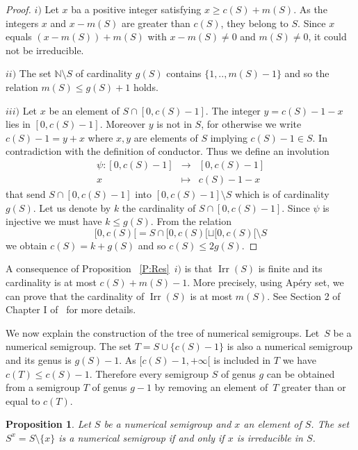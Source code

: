 \documentclass[reqno,11pt]{amsart}
\theoremstyle{plain}
\newtheorem{prop}{Proposition}[section]
\theoremstyle{definition}
\renewcommand{\leq}{\leqslant}
\renewcommand{\geq}{\geqslant}
\newcommand{\NN}{\mathbb{N}}
\DeclareMathOperator{\Irr}{Irr}
\begin{document}
\begin{proof}
$i)$ Let $x$ ba a positive integer satisfying $x \geq c(S)+m(S)$. 
As the integers $x$ and $x-m(S)$ are greater than $c(S)$, they belong to $S$.
Since $x$ equals $(x-m(S))+m(S)$ with $x-m(S)\not=0$ and $m(S)\not=0$, it could not be irreducible.

$ii)$ The set $\NN\setminus{S}$ of cardinality $g(S)$ contains $\{1,..,m(S)-1\}$ and so the relation $m(S)\leq g(S)+1$ holds.

$iii)$ Let $x$ be an element of $S\cap[0,c(S)-1]$. 
The integer $y=c(S)-1-x$ lies in $[0,c(S)-1]$. 
Moreover $y$ is not in $S$, for otherwise  we write $c(S)-1=y+x$ where $x,y$ are elements of $S$ implying $c(S)-1\in S$. 
In contradiction with the definition of conductor. 
Thus we define an involution 
\[
\begin{array}{rcl}
\psi:[0,c(S)-1]&\to&[0,c(S)-1]\\
x&\mapsto&c(S)-1-x
\end{array}
\]
that send $S\cap[0,c(S)-1]$ into $[0,c(S)-1]\setminus S$ which is  of cardinality $g(S)$. 
Let us denote by $k$ the cardinality  of $S\cap[0,c(S)-1]$. 
Since $\psi$ is injective we must have $k\leq g(S)$. 
From the relation 
\[
[0,c(S)[=S\cap[0,c(S)[\sqcup[0,c(S)[\setminus S
\]
 we obtain $c(S)=k+g(S)$ and so $c(S)\leq 2 g(S)$.
\end{proof}

A consequence of Proposition~ \ref{P:Res}~$i)$ is that $\Irr(S)$ is finite and its cardinality is at most $c(S)+m(S)-1$.
More precisely, using Ap\'ery set, we can prove that  the cardinality of $\Irr(S)$ is at most $m(S)$. See Section 2 of Chapter I of~\cite{BookNS} for more details.

We now explain the construction of the tree of numerical semigroups.
Let~$S$ be a numerical semigroup. The set $T=S\cup\{c(S)-1\}$ is also a numerical  semigroup and its genus is $g(S)-1$. 
As  $[c(S)-1,+\infty[$ is included in $T$ we have $c(T)\leq c(S)-1$. 
Therefore every semigroup $S$ of genus $g$ can be obtained from a semigroup $T$ of genus $g-1$ by removing an element of~$T$ greater than or equal to $c(T)$.

\begin{prop}
\label{P:Sx}
Let $S$ be a numerical semigroup and $x$ an element of $S$. The set~$S^x=S\setminus\{x\}$ is a numerical semigroup if and only if $x$ is irreducible in $S$.
\end{prop}
\end{document}
